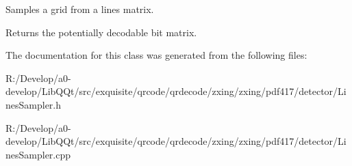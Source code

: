 Samples a grid from a lines matrix.

\begin{DoxyReturn}{Returns}
the potentially decodable bit matrix. 
\end{DoxyReturn}


The documentation for this class was generated from the following files\+:\begin{DoxyCompactItemize}
\item 
R\+:/\+Develop/a0-\/develop/\+Lib\+Q\+Qt/src/exquisite/qrcode/qrdecode/zxing/zxing/pdf417/detector/Lines\+Sampler.\+h\item 
R\+:/\+Develop/a0-\/develop/\+Lib\+Q\+Qt/src/exquisite/qrcode/qrdecode/zxing/zxing/pdf417/detector/Lines\+Sampler.\+cpp\end{DoxyCompactItemize}

